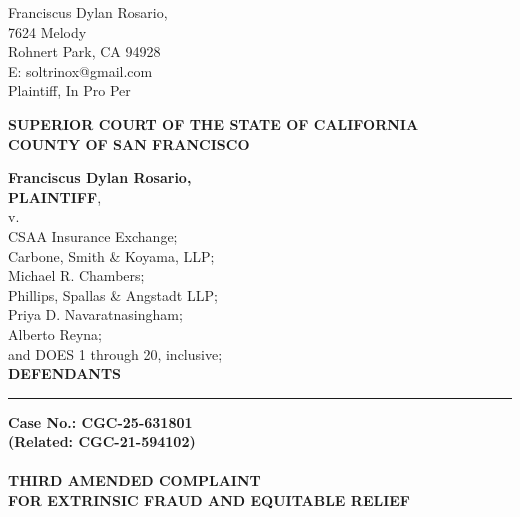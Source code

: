 

\nolinenumbers
\begin{singlespace}
Franciscus Dylan Rosario, \\
7624 Melody \\
Rohnert Park, CA 94928 \\
E: soltrinox@gmail.com \\
Plaintiff, In Pro Per \\
\end{singlespace}
\vspace*{9mm}
\begin{tightcenter}
\textbf{SUPERIOR COURT OF THE STATE OF CALIFORNIA} \\
\textbf{COUNTY OF SAN FRANCISCO}
\end{tightcenter}
\vspace*{2.25mm}
\nolinenumbers
\begin{minipage}[t]{3in}
    \raggedright
    \textbf{Franciscus Dylan Rosario,} \\ \textbf{PLAINTIFF}, \\
    \hspace{1cm} v. \\
    \small
    CSAA Insurance Exchange; \\
    Carbone, Smith \& Koyama, LLP; \\
    Michael R. Chambers; \\
    Phillips, Spallas \& Angstadt LLP; \\
    Priya D. Navaratnasingham; \\
    Alberto Reyna; \\
    and DOES 1 through 20, inclusive; \\
    \normalsize
    \textbf{DEFENDANTS}
    \makebox[3in]{\hrulefill}
\end{minipage}%
\hspace{3mm}
\begin{minipage}[t]{0.5pt}
    \vspace{0pt}
    \rule{0.5pt}{3.1in}
\end{minipage}
\hspace{3mm}
\begin{minipage}[t]{3in}
    \raggedright
    \noindent \textbf{Case No.: CGC-25-631801} \\
    \textbf{(Related: CGC-21-594102)} \\
    ~\\
    \textbf{THIRD AMENDED COMPLAINT} \\
    \textbf{FOR EXTRINSIC FRAUD AND EQUITABLE RELIEF}
\end{minipage}

